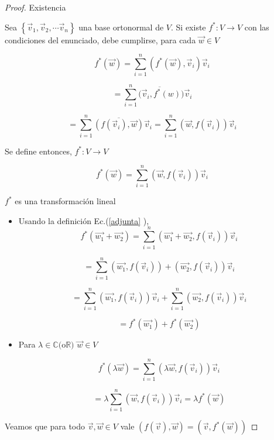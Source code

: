 {\begin{theorem}
\begin{proof}
\bigskip

Existencia


Sea  $\left\{\vec{v}_1,\vec{v}_2, \cdots\vec{v}_n\right\}$ una base ortonormal de $V$. Si existe $f ^{*}: V \rightarrow V  $ con las condiciones del enunciado, debe cumplirse, para cada $\vec{w} \in V $


$$f ^{*}(\vec{w})= \sum_{i=1}^n (f ^{*}(\vec{w}), \vec{v}_i)\vec{v}_i$$

$$= \sum_{i=1}^n \overline{  ( \vec{v}_i,f ^{*}( w)})\vec{v}_i$$

$$ = \sum_{i=1}^n \overline{  (f(\vec{v}_i),\vec{w})}\vec{v}_i = \sum_{i=1}^n (\vec{w}, f(\vec{v}_i))\vec{v}_i  $$

Se define entonces, $f ^{*}: V \rightarrow V  $

\begin{equation}
  \label{adjunta}  
f ^{*}(\vec{w})= \sum_{i=1}^n (\vec{w},  f(\vec{v}_i))\vec{v}_i
\end{equation}

\bigskip

$f ^{*}$ es una transformación lineal


\begin{itemize}
     
    
    \item
    Usando la definición Ec.(\ref{adjunta} ),
    $$f ^{*}(\vec{w_1}+\vec{w_2} )=  \sum_{i=1}^n ( \vec{w_1}+\vec{w_2} ,  f(\vec{v}_i))\vec{v}_i $$
    
    $$=  \sum_{i=1}^n ( \vec{w_1} ,  f(\vec{v}_i)) + (\vec{w_2} ,  f(\vec{v}_i))\vec{v}_i $$
    
    $$=  \sum_{i=1}^n ( \vec{w_1} ,  f(\vec{v}_i))\vec{v}_i +  \sum_{i=1}^n (\vec{w_2} ,  f(\vec{v}_i))\vec{v}_i $$
    
    $$= f ^{*}(\vec{w_1} )+ f ^{*}(\vec{w_2} )$$
    
    \item
    
    
    Para $\lambda \in \mathbb{C} ($o$  \mathbb{R})$  $\vec{w} \in V$
    
    $$f ^{*}(\lambda \vec{w} )=  \sum_{i=1}^n ( \lambda \vec{w} ,  f(\vec{v}_i))\vec{v}_i $$
    
    $$ = \lambda \sum_{i=1}^n  (\vec{w} ,  f(\vec{v}_i))\vec{v}_i= \lambda f ^{*} (\vec{w})    $$
    
\end{itemize}

\bigskip


Veamos que para todo $ \vec{v},  \vec{w} \in V $ vale $(f(\vec{v}),\vec{w})=(\vec{v},f ^{*}(\vec{w}))$


\end{proof}
\end{theorem}}
